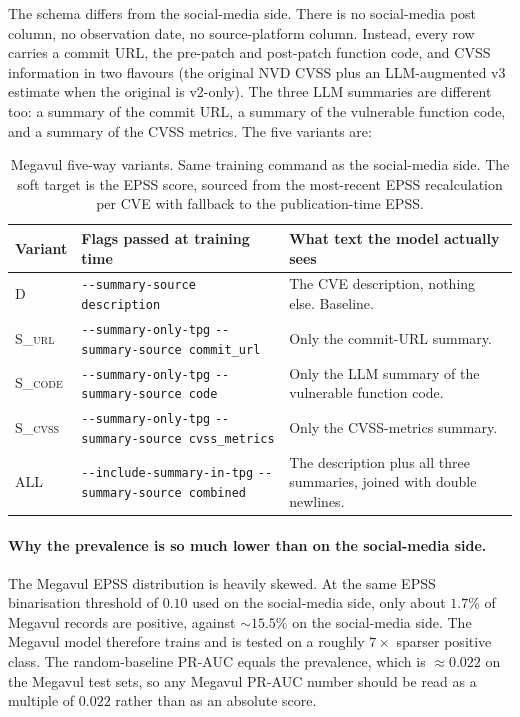 \documentclass[11pt]{article}
\begin{document}
The schema differs from the social-media side. There is no social-media
post column, no observation date, no source-platform column. Instead,
every row carries a commit URL, the pre-patch and post-patch function
code, and CVSS information in two flavours (the original NVD CVSS plus
an LLM-augmented v3 estimate when the original is v2-only). The three
LLM summaries are different too: a summary of the commit URL, a summary
of the vulnerable function code, and a summary of the CVSS metrics.
The five variants are:

\begin{table}[h]
\centering
\footnotesize
\begin{tabularx}{\textwidth}{@{}l Y Y@{}}
\toprule
Variant & Flags passed at training time & What text the model actually sees \\
\midrule
\textsc{D}        & \texttt{-{}-summary-source description} & The CVE description, nothing else. Baseline. \\[2pt]
\textsc{S\_url}   & \texttt{-{}-summary-only-tpg} \newline \texttt{-{}-summary-source commit\_url} & Only the commit-URL summary. \\[2pt]
\textsc{S\_code}  & \texttt{-{}-summary-only-tpg} \newline \texttt{-{}-summary-source code} & Only the LLM summary of the vulnerable function code. \\[2pt]
\textsc{S\_cvss}  & \texttt{-{}-summary-only-tpg} \newline \texttt{-{}-summary-source cvss\_metrics} & Only the CVSS-metrics summary. \\[2pt]
\textsc{ALL}      & \texttt{-{}-include-summary-in-tpg} \newline \texttt{-{}-summary-source combined} & The description plus all three summaries, joined with double newlines. \\
\bottomrule
\end{tabularx}
\caption{Megavul five-way variants. Same training command as the
social-media side. The soft target is the EPSS score, sourced from
the most-recent EPSS recalculation per CVE with fallback to the
publication-time EPSS.}
\end{table}

\paragraph{Why the prevalence is so much lower than on the social-media side.}
The Megavul EPSS distribution is heavily skewed. At the same EPSS
binarisation threshold of $0.10$ used on the social-media side, only
about $1.7\%$ of Megavul records are positive, against $\sim 15.5\%$
on the social-media side. The Megavul model therefore trains and is
tested on a roughly $7\times$ sparser positive class. The
random-baseline PR-AUC equals the prevalence, which is $\approx 0.022$
on the Megavul test sets, so any Megavul PR-AUC number should be read
as a multiple of $0.022$ rather than as an absolute score.
\end{document}
